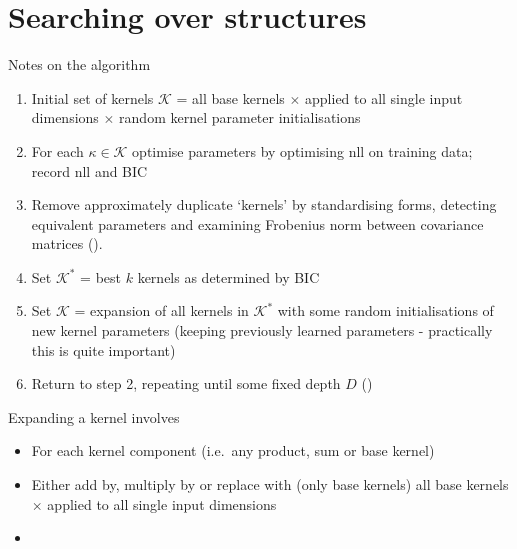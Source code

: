 \documentclass[twoside]{article}
\begin{document}
%


\section{Searching over structures}



Notes on the algorithm
\begin{enumerate}
\item Initial set of kernels $\mathcal{K}$ = all base kernels $\times$ applied to all single input dimensions $\times$ random kernel parameter initialisations
\item For each $\kappa \in \mathcal{K}$ optimise parameters by optimising nll on training data; record nll and BIC 
\item Remove approximately duplicate `kernels' by standardising forms, detecting equivalent parameters and examining Frobenius norm between covariance matrices ().
\item Set $\mathcal{K}^*$ = best $k$ kernels as determined by BIC 
\item Set $\mathcal{K}$ = expansion of all kernels in $\mathcal{K}^*$ with some random initialisations of new kernel parameters (keeping previously learned parameters - practically this is quite important)
\item Return to step 2, repeating until some fixed depth $D$ ()
\end{enumerate}

Expanding a kernel involves
\begin{itemize}
\item For each kernel component (i.e.~any product, sum or base kernel)
\item Either add by, multiply by or replace with (only base kernels) all base kernels $\times$ applied to all single input dimensions
\item {}
\end{itemize}
\end{document}
